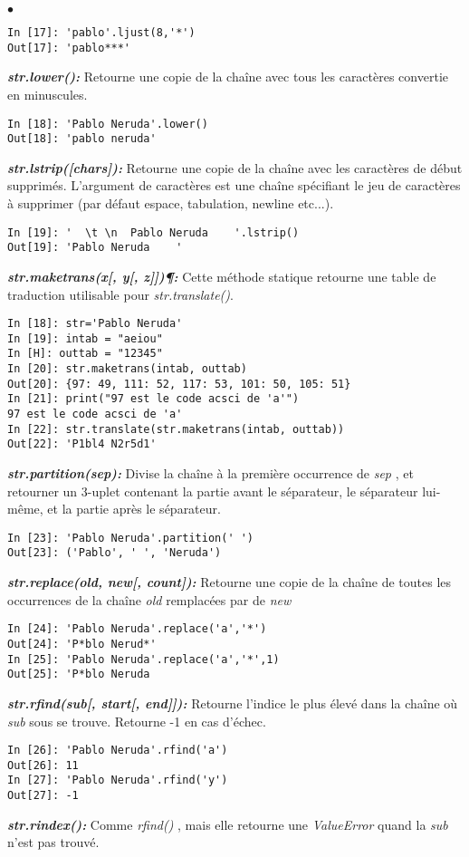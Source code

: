 \documentclass[10pt,dvipsnames,  dvips]{article}
\begin{document}
\begin{list}{$\bullet$}{}
\begin{lstlisting}
In [17]: 'pablo'.ljust(8,'*')
Out[17]: 'pablo***'
\end{lstlisting}
\item \textit{\textbf{str.lower(): }} Retourne une copie de la chaîne avec tous les caractères convertie en minuscules.
\begin{lstlisting}
In [18]: 'Pablo Neruda'.lower()
Out[18]: 'pablo neruda'
\end{lstlisting}
\item \textit{\textbf{ str.lstrip([chars]): }}  Retourne une copie de la chaîne avec les caractères de début supprimés. L'argument de caractères est une chaîne spécifiant le jeu de caractères à supprimer (par défaut espace, tabulation, newline etc...).
\begin{lstlisting}
In [19]: '  \t \n  Pablo Neruda    '.lstrip()
Out[19]: 'Pablo Neruda    '
\end{lstlisting}
\item \textit{\textbf{str.maketrans(x[, y[, z]])¶: }} Cette méthode statique retourne une table de traduction utilisable pour \textit{str.translate()}.
\begin{lstlisting}
In [18]: str='Pablo Neruda'
In [19]: intab = "aeiou"
In [H]: outtab = "12345"
In [20]: str.maketrans(intab, outtab)
Out[20]: {97: 49, 111: 52, 117: 53, 101: 50, 105: 51}
In [21]: print("97 est le code acsci de 'a'")
97 est le code acsci de 'a'
In [22]: str.translate(str.maketrans(intab, outtab))
Out[22]: 'P1bl4 N2r5d1'
\end{lstlisting}
\item \textit{\textbf{str.partition(sep): }} Divise la chaîne à la première occurrence de \textit{sep} , et retourner un 3-uplet contenant la partie avant le séparateur, le séparateur lui-même, et la partie après le séparateur.
\begin{lstlisting}
In [23]: 'Pablo Neruda'.partition(' ')
Out[23]: ('Pablo', ' ', 'Neruda')
\end{lstlisting}
\item \textit{\textbf{str.replace(old, new[, count]): }} Retourne une copie de la chaîne de toutes les occurrences de la chaîne \textit{old} remplacées par de \textit{new}
\begin{lstlisting}
In [24]: 'Pablo Neruda'.replace('a','*')
Out[24]: 'P*blo Nerud*'
In [25]: 'Pablo Neruda'.replace('a','*',1)
Out[25]: 'P*blo Neruda
\end{lstlisting}
\item \textit{\textbf{str.rfind(sub[, start[, end]]): }} Retourne l'indice le plus élevé dans la chaîne où \textit{sub} sous se trouve. Retourne -1 en cas d'échec.
\begin{lstlisting}
In [26]: 'Pablo Neruda'.rfind('a')
Out[26]: 11
In [27]: 'Pablo Neruda'.rfind('y')
Out[27]: -1
\end{lstlisting}
\item \textit{\textbf{str.rindex(): }} Comme \textit{rfind()} , mais elle retourne une \textit{ValueError} quand la \textit{sub} n'est pas trouvé.
\begin{lstlisting}


\end{lstlisting}
\end{list}
\end{document}
